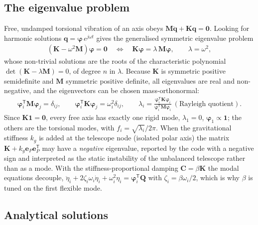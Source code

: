 \documentclass[10pt,a4paper]{article}
\numberwithin{equation}{section}
\begin{document}
\subsection{The eigenvalue problem}
Free, undamped torsional vibration of an axis obeys $\mathbf M\ddot{\mathbf q} + \mathbf K\mathbf q = \mathbf 0$. Looking for harmonic solutions $\mathbf q = \boldsymbol\varphi\,e^{j\omega t}$ gives the generalised symmetric eigenvalue problem
\begin{gather}
\left(\mathbf K - \omega^2\mathbf M\right)\boldsymbol\varphi = \mathbf 0 \quad\Longleftrightarrow\quad \mathbf K\boldsymbol\varphi = \lambda\,\mathbf M\boldsymbol\varphi,\qquad \lambda = \omega^2,
\end{gather}
whose non-trivial solutions are the roots of the characteristic polynomial $\det(\mathbf K - \lambda\mathbf M) = 0$, of degree $n$ in $\lambda$. Because $\mathbf K$ is symmetric positive semidefinite and $\mathbf M$ symmetric positive definite, all eigenvalues are real and non-negative, and the eigenvectors can be chosen mass-orthonormal:
\begin{gather}
\boldsymbol\varphi_i^{\mathsf T}\mathbf M\boldsymbol\varphi_j = \delta_{ij},\qquad \boldsymbol\varphi_i^{\mathsf T}\mathbf K\boldsymbol\varphi_j = \omega_i^2\delta_{ij},\qquad \lambda_i = \frac{\boldsymbol\varphi_i^{\mathsf T}\mathbf K\boldsymbol\varphi_i}{\boldsymbol\varphi_i^{\mathsf T}\mathbf M\boldsymbol\varphi_i}\ (\text{Rayleigh quotient}).
\end{gather}
Since $\mathbf K\mathbf 1 = \mathbf 0$, every free axis has exactly one rigid mode, $\lambda_1 = 0$, $\boldsymbol\varphi_1\propto\mathbf 1$; the others are the torsional modes, with $f_i = \sqrt{\lambda_i}/2\pi$. When the gravitational stiffness $k_g$ is added at the telescope node (isolated polar axis) the matrix $\mathbf K + k_g\mathbf e_P\mathbf e_P^{\mathsf T}$ may have a \emph{negative} eigenvalue, reported by the code with a negative sign and interpreted as the static instability of the unbalanced telescope rather than as a mode. With the stiffness-proportional damping $\mathbf C = \beta\mathbf K$ the modal equations decouple, $\ddot\eta_i + 2\zeta_i\omega_i\dot\eta_i + \omega_i^2\eta_i = \boldsymbol\varphi_i^{\mathsf T}\mathbf Q$ with $\zeta_i = \beta\omega_i/2$, which is why $\beta$ is tuned on the first flexible mode.
\subsection{Analytical solutions}
\end{document}
